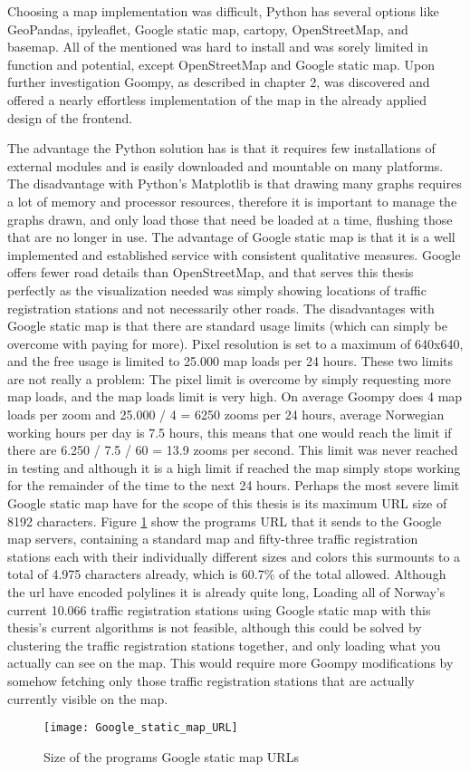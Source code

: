 Choosing a map implementation was difficult, Python has several options like GeoPandas, ipyleaflet, Google static map, cartopy, OpenStreetMap, and basemap. All of the mentioned was hard to install and was sorely limited in function and potential, except OpenStreetMap and Google static map. Upon further investigation Goompy, as described in chapter 2, was discovered and offered a nearly effortless implementation of the map in the already applied design of the frontend.

The advantage the Python solution has is that it requires few installations of external modules and is easily downloaded and mountable on many platforms.
The disadvantage with Python's Matplotlib is that drawing many graphs requires a lot of memory and processor resources, therefore it is important to manage the graphs drawn, and only load those that need be loaded at a time, flushing those that are no longer in use.
The advantage of Google static map is that it is a well implemented and established service with consistent qualitative measures. Google offers fewer road details than OpenStreetMap, and that serves this thesis perfectly as the visualization needed was simply showing locations of traffic registration stations and not necessarily other roads.
The disadvantages with Google static map is that there are standard usage limits (which can simply be overcome with paying for more). Pixel resolution is set to a maximum of 640x640, and the free usage is limited to 25.000 map loads per 24 hours. These two limits are not really a problem: The pixel limit is overcome by simply requesting more map loads, and the map loads limit is very high. On average Goompy does 4 map loads per zoom and 25.000 / 4 = 6250 zooms per 24 hours, average Norwegian working hours per day is 7.5 hours, this means that one would reach the limit if there are 6.250 / 7.5 / 60 = 13.9 zooms per second. This limit was never reached in testing and although it is a high limit if reached the map simply stops working for the remainder of the time to the next 24 hours. Perhaps the most severe limit Google static map have for the scope of this thesis is its maximum URL size of 8192 characters. Figure \ref{fig:google_url} show the programs URL that it sends to the Google map servers, containing a standard map and fifty-three traffic registration stations each with their individually different sizes and colors this surmounts to a total of 4.975 characters already, which is 60.7\% of the total allowed. Although the url have encoded polylines it is already quite long, Loading all of Norway's current 10.066 traffic registration stations using Google static map with this thesis's current algorithms is not feasible, although this could be solved by clustering the traffic registration stations together, and only loading what you actually can see on the map. This would require more Goompy modifications by somehow fetching only those traffic registration stations that are actually currently visible on the map.

\begin{figure}[h]
\texttt{[image: Google\_static\_map\_URL]}
\centering
\caption{Size of the programs Google static map URLs}
\label{fig:google_url}
\end{figure}